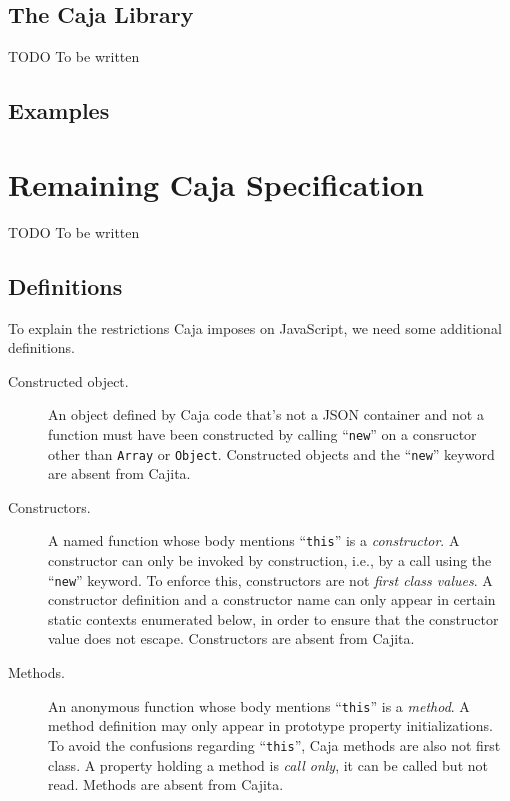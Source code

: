 \documentclass[letterpaper,twocolumn,10pt]{article}
\newcommand{\code}[1]{{\tt {#1}}}              %
\begin{document}
\subsection{The Caja Library}

TODO To be written

\subsection{Examples}


\section{Remaining Caja Specification}
\label{sec:caja-spec}

TODO To be written




\subsection{Definitions}

To explain the restrictions Caja imposes on JavaScript, we need some
additional definitions. 

\begin{description}

  \item[Constructed object.] An object defined by Caja code that's not a 
  JSON container and not a function must have been constructed by calling 
  ``\code{new}'' on a consructor other than \code{Array} or \code{Object}. 
  Constructed objects and the ``\code{new}'' keyword are absent from Cajita.

  \item[Constructors.] A named function whose body mentions ``\code{this}'' 
  is a \emph{constructor}. A constructor can only be invoked by construction, 
  i.e., by a call using the ``\code{new}'' keyword. To enforce this, 
  constructors are not \emph{first class values}. A constructor definition 
  and a constructor name can only appear in certain static contexts 
  enumerated below, in order to ensure that the constructor value does not 
  escape. Constructors are absent from Cajita.
    
  \item[Methods.] An anonymous function whose body mentions ``\code{this}'' 
  is a \emph{method}. A method definition may only appear in prototype 
  property initializations. To avoid the confusions regarding 
  ``\code{this}'', Caja methods are also not first class. A property holding 
  a method is \emph{call only}, it can be called but not read. Methods are 
  absent from Cajita.

\end{description}
\end{document}
